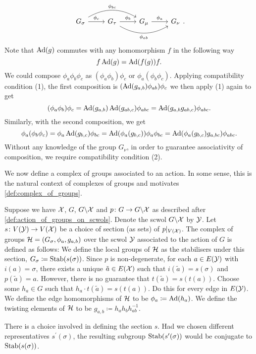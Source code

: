 \[
	\begin{tikzcd}
		G_\sigma \ar[r, "\phi_c"] \ar[rr, bend left, "\phi_{bc}"] & G_\tau \ar[r, "\phi_b"] \ar[rr, bend right, "\phi_{ab}"'] & G_\mu \ar[r, "\phi_a"] & G_\nu
	\end{tikzcd}
	.\]
Note that $\operatorname{Ad}(g)$ commutes with any homomorphism $f$ in the following way
\[
	f\operatorname{Ad}(g) = \operatorname{Ad}(f(g))f
	.\]
We could compose $\phi_a\phi_b\phi_c$ as $(\phi_a\phi_b)\phi_c$ or $\phi_a(\phi_b\phi_c)$.
Applying compatibility condition (1), the first composition is $(\operatorname{Ad}(g_{a,b})\phi_{ab})\phi_c$ we then apply (1) again to get
\[
	(\phi_a\phi_b)\phi_c = \operatorname{Ad}(g_{a,b})\operatorname{Ad}(g_{ab,c})\phi_{abc} = \operatorname{Ad}(g_{a,b}g_{ab,c})\phi_{abc}
	.\]
Similarly, with the second composition, we get
\[
	\phi_a(\phi_b\phi_c) = \phi_a\operatorname{Ad}(g_{b,c})\phi_{bc} = \operatorname{Ad}(\phi_a(g_{b,c}))\phi_a\phi_{bc} = \operatorname{Ad}(\phi_a(g_{b,c})g_{a,bc})\phi_{abc}
	.\]
Without any knowledge of the group $G_\nu$, in order to guarantee associativity of composition, we require compatibility condition (2).

We now define a complex of groups associated to an action.
In some sense, this is the natural context of complexes of groups and motivates  \cref{def:complex_of_groups}.
\begin{definition}
	Suppose we have $\mathcal{X}$, $G$, $G \backslash \mathcal{X}$ and $p \colon G \to G \backslash \mathcal{X}$ as described after \cref{def:action_of_groups_on_scwols}.
	Denote the scwol $G \backslash \mathcal{X}$ by $\mathcal{Y}$.
	Let $s \colon V(\mathcal{Y}) \to V(\mathcal{X})$ be a choice of section (as sets) of $p|_{V(\mathcal{X})}$.
	The complex of groups $\mathcal{H} = (G_\sigma, \phi_a, g_{a,b})$ over the scwol $\mathcal{Y}$ associated to the action of $G$ is defined as follows:
	We define the local groups of $\mathcal{H}$ as the stabilisers under this section, $G_\sigma \coloneqq \operatorname{Stab}(s(\sigma))$.
	Since $p$ is non-degenerate, for each $a \in E(\mathcal{Y})$ with $i(a) = \sigma$, there exists a unique $\tilde{a} \in E(\mathcal{X})$ such that $i(\tilde{a}) = s(\sigma)$ and $p(\tilde{a}) = a$.
	However, there is no guarantee that $t(\tilde{a}) = s(t(a))$.
	Choose some $h_a \in G$ such that $h_a \cdot t(\tilde{a}) = s(t(a))$.
	Do this for every edge in $E(\mathcal{Y})$.
	We define the edge homomorphisms of $\mathcal{H}$ to be $\phi_a \coloneqq \operatorname{Ad}(h_a)$.
	We define the twisting elements of $\mathcal{H}$ to be $g_{a,b} \coloneq h_ah_bh_{ab}^{-1}$.
	\label{def:complex_of_groups_from_action}
\end{definition}

There is a choice involved in defining the section $s$.
Had we chosen different representatives $s^\prime(\sigma)$, the resulting  subgroup $\operatorname{Stab}(s^\prime(\sigma))$ would be conjugate to $\operatorname{Stab}(s(\sigma))$.

